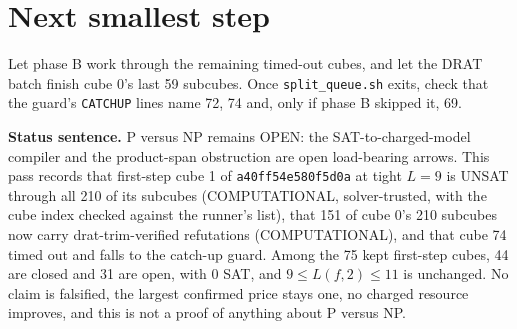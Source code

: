 \documentclass[11pt]{article}
\begin{document}
\section*{Next smallest step}
Let phase B work through the remaining timed-out cubes, and let the DRAT batch finish cube 0's last 59 subcubes. Once \texttt{split\_queue.sh} exits, check that the guard's \texttt{CATCHUP} lines name 72, 74 and, only if phase B skipped it, 69.

\bigskip
\noindent\textbf{Status sentence.} P versus NP remains OPEN: the SAT-to-charged-model compiler and the product-span obstruction are open load-bearing arrows. This pass records that first-step cube 1 of \texttt{a40ff54e580f5d0a} at tight $L=9$ is UNSAT through all 210 of its subcubes (COMPUTATIONAL, solver-trusted, with the cube index checked against the runner's list), that 151 of cube 0's 210 subcubes now carry drat-trim-verified refutations (COMPUTATIONAL), and that cube 74 timed out and falls to the catch-up guard. Among the 75 kept first-step cubes, 44 are closed and 31 are open, with 0 SAT, and $9\le L(f,2)\le 11$ is unchanged. No claim is falsified, the largest confirmed price stays one, no charged resource improves, and this is not a proof of anything about P versus NP.
\end{document}
